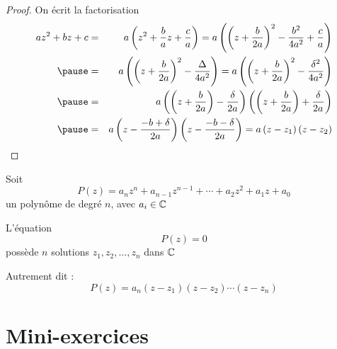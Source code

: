 \begin{frame}

\pause

\begin{proof}
  On écrit la factorisation
  \begin{eqnarray*}
    az^2 + bz + c & = & a \left( z^2 + \frac{b}{a} z + \frac{c}{a} \right) = a
    \left( \left( z + \frac{b}{2 a} \right)^2 - \frac{b^2}{4 a^2} +
    \frac{c}{a} \right) \\
\pause
    & = & a \left( \left( z + \frac{b}{2 a} \right)^2 -
    \frac{\Delta}{4 a^2} \right)
    = a \left( \left( z + \frac{b}{2 a} \right)^2 - \frac{\delta^2}{4
    a^2} \right) \\
\pause
    & = & a \left( \left( z + \frac{b}{2 a} \right) - \frac{\delta}{2
    a^{}} \right)  \left( \left( z + \frac{b}{2 a} \right) + \frac{\delta}{2
    a^{}} \right)\\
\pause
    & = & a \left( z - \frac{- b + \delta}{2 a} \right)  \left( z - \frac{- b
    - \delta}{2 a} \right) = a \left( z - z_1 \right)  \left( z - z_2 \right)
  \end{eqnarray*}
\end{proof}

\end{frame}

\begin{frame}

Soit
$$P(z)=a_n z^n+a_{n-1}z^{n-1}+\cdots + a_2 z^2 + a_1z+a_0$$
un polynôme de degré $n$, avec $a_i \in \mathbb{C}$

\bigskip

\begin{theoreme} 
L'équation 
$$P(z)=0$$
possède $n$ solutions $z_1, z_2,\ldots,z_n$ dans $\mathbb{C}$
\end{theoreme}

\pause
\bigskip

Autrement dit :
$$P(z) = a_n(z-z_1)(z-z_2)\cdots(z-z_n)$$
\end{frame}


\section{Mini-exercices}

